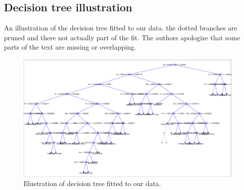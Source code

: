 \subsection{Decision tree illustration} \label{dt-illustration}

An illustration of the decision tree fitted to our data. the dotted branches are pruned and there not actually part of the fit. The authors apologize that some parts of the text are missing or overlapping.

\begin{figure}[h]
    \centering
    \includegraphics[width=1.6\textwidth,angle=270]{fig/dt-illustration.eps}
    \caption{Illustration of decision tree fitted to our data.}
    \label{dt-illustration}
\end{figure}